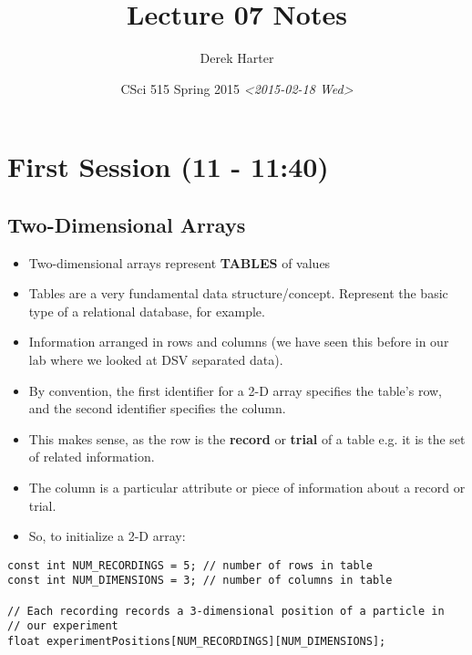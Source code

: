 \documentclass[11pt]{article}
\author{Derek Harter}
\date{CSci 515 Spring 2015 \textit{<2015-02-18 Wed>}}
\title{Lecture 07 Notes}
\begin{document}
\maketitle

\section{First Session (11 - 11:40)}
\label{sec-1}
\subsection{Two-Dimensional Arrays}
\label{sec-1-1}
\begin{itemize}
\item Two-dimensional arrays represent \textbf{TABLES} of values
\item Tables are a very fundamental data structure/concept.  Represent
the basic type of a relational database, for example.
\item Information arranged in rows and columns (we have seen this before
in our lab where we looked at DSV separated data).
\item By convention, the first identifier for a 2-D array specifies the
table's row, and the second identifier specifies the column.
\item This makes sense, as the row is the \textbf{record} or \textbf{trial} of a table
e.g. it is the set of related information.
\item The column is a particular attribute or piece of information about
a record or trial.
\item So, to initialize a 2-D array:
\end{itemize}

\begin{verbatim}
const int NUM_RECORDINGS = 5; // number of rows in table
const int NUM_DIMENSIONS = 3; // number of columns in table

// Each recording records a 3-dimensional position of a particle in
// our experiment
float experimentPositions[NUM_RECORDINGS][NUM_DIMENSIONS];
\end{verbatim}
\end{document}
